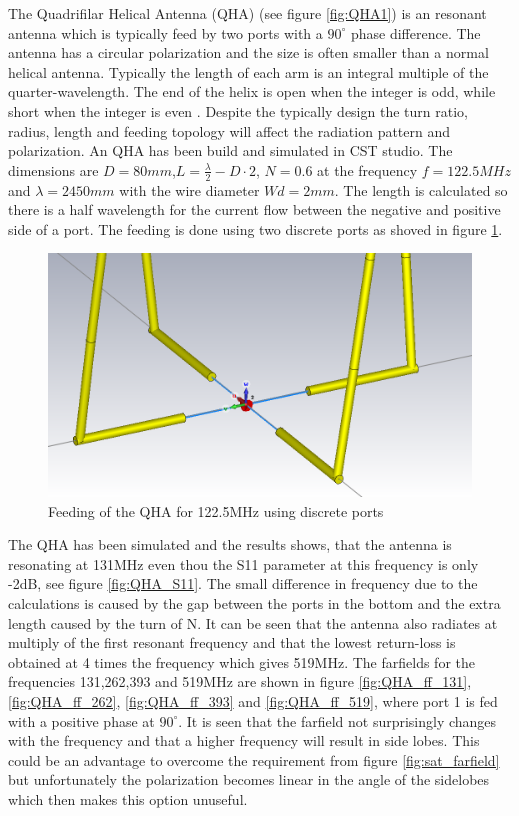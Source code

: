 The Quadrifilar Helical Antenna (QHA) (see figure \ref{fig:QHA1}) is an resonant antenna which is typically feed by two ports with a $90^\circ$ phase difference. The antenna has a circular polarization and the size is often smaller than a normal helical antenna. Typically the length of each arm is an integral multiple of the quarter-wavelength. The end of the helix
is open when the integer is odd, while short when the integer is
even \citep{Bai2014}. Despite the typically design the turn ratio, radius, length and feeding topology will affect the radiation pattern and polarization. 
\newline
\newline
An QHA has been build and simulated in CST studio. The dimensions are $D=80mm$,$L=\frac{\lambda}{2}-D\cdot 2$, $N=0.6$ at the frequency $f=122.5MHz$ and $\lambda = 2450mm$ with the wire diameter $Wd = 2mm$. The length is calculated so there is a half wavelength for the current flow between the negative and positive side of a port. The feeding is done using two discrete ports as shoved in figure \ref{fig:QHA2}.  

\begin{figure}[H]
\centering 
\includegraphics[scale = 0.4]{figures/antennas/qha/qha_6_feeding}
\caption{Feeding of the QHA for 122.5MHz using discrete ports}
\label{fig:QHA2}
\end{figure}
 
The QHA has been simulated and the results shows, that the antenna is resonating at 131MHz even thou the S11 parameter at this frequency is only -2dB, see figure \ref{fig:QHA_S11}. The small difference in frequency due to the calculations is caused by the gap between the ports in the bottom and the extra length caused by the turn of N. It can be seen that the antenna also radiates at multiply of the first resonant frequency and that the lowest return-loss is obtained at 4 times the frequency which gives 519MHz. The farfields for the frequencies 131,262,393 and 519MHz are shown in figure \ref{fig:QHA_ff_131}, \ref{fig:QHA_ff_262}, \ref{fig:QHA_ff_393} and \ref{fig:QHA_ff_519}, where port 1 is fed with a positive phase at $90^\circ$. It is seen that the farfield not surprisingly changes with the frequency and that a higher frequency will result in side lobes. This could be an advantage to overcome the requirement from figure \ref{fig:sat_farfield} but unfortunately the polarization becomes linear in the angle of the sidelobes which then makes this option unuseful.        

